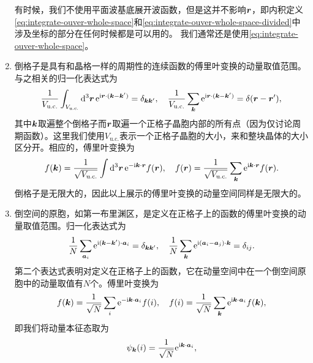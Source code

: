 \begin{enumerate}
    有时候，我们不使用平面波基底展开波函数，但是这并不影响$\vb*{r}$，即内积定义\eqref{eq:integrate-ouver-whole-space}和\eqref{eq:integrate-ouver-whole-space-divided}中涉及坐标的部分在任何时候都是可以用的。
    我们通常还是使用\eqref{eq:integrate-ouver-whole-space}。

    \item 倒格子是具有和晶格一样的周期性的连续函数的傅里叶变换的动量取值范围。与之相关的归一化表达式为
    \begin{equation}
        \frac{1}{V_\text{u.c.}} \int_{V_\text{u.c.}} \dd[3]{\vb*{r}} \mathrm{e}^{\mathrm{i} \vb*{r} \cdot (\vb*{k} - \vb*{k}')} = \delta_{\vb*{k} \vb*{k}'}, \quad \frac{1}{V_\text{u.c.}} \sum_{\vb*{k}} \mathrm{e}^{\mathrm{i} \vb*{r} \cdot (\vb*{k} - \vb*{k}')} = \delta(\vb*{r} - \vb*{r}'), 
        \label{eq:normalization-periodic}
    \end{equation}
    其中$\vb*{k}$取遍整个倒格子而$\vb*{r}$取遍一个正格子晶胞内部的所有点（因为仅讨论周期函数）。这里我们使用$V_\text{u.c.}$表示一个正格子晶胞的大小，来和整块晶体的大小区分开。相应的，傅里叶变换为
    \begin{equation}
        f(\vb*{k}) = \frac{1}{\sqrt{V_\text{u.c.}}} \int \dd[3]{\vb*{r}} \mathrm{e}^{- \mathrm{i} \vb*{k} \cdot \vb*{r}} f(\vb*{r}), \quad f(\vb*{r}) = \frac{1}{\sqrt{V_\text{u.c.}}} \sum_{\vb*{k}} \mathrm{e}^{\mathrm{i} \vb*{k} \cdot \vb*{r}} f(\vb*{r}).
    \end{equation}
    倒格子是无限大的，因此以上展示的傅里叶变换的动量空间同样是无限大的。
    \item 倒空间的原胞，如第一布里渊区，是定义在正格子上的函数的傅里叶变换的动量取值范围。归一化表达式为
    \begin{equation}
        \frac{1}{N} \sum_{\vb*{a}_i} \mathrm{e}^{\mathrm{i} (\vb*{k} - \vb*{k}') \cdot \vb*{a}_i} = \delta_{\vb*{k} \vb*{k}'}, \quad \frac{1}{N} \sum_{\vb*{k}} \mathrm{e}^{\mathrm{i} (\vb*{a}_i - \vb*{a}_j) \cdot \vb*{k}} = \delta_{ij}.
    \end{equation}
    第二个表达式表明对定义在正格子上的函数，它在动量空间中在一个倒空间原胞中的动量取值有$N$个。傅里叶变换为
    \begin{equation}
        f(\vb*{k}) = \frac{1}{\sqrt{N}} \sum_{i} \mathrm{e}^{- \mathrm{i} \vb*{k} \cdot \vb*{a}_i} f(i), \quad f(i) = \frac{1}{\sqrt{N}} \sum_{\vb*{k}} \mathrm{e}^{\mathrm{i} \vb*{k} \cdot \vb*{a}_i} f(\vb*{k}),
        \label{eq:lattice-fourier}
    \end{equation}
    即我们将动量本征态取为
    \begin{equation}
        \psi_{\vb*{k}}(i) = \frac{1}{\sqrt{N}} \mathrm{e}^{\mathrm{i} \vb*{k} \cdot \vb*{a}_i},
    \end{equation}

\end{enumerate}
